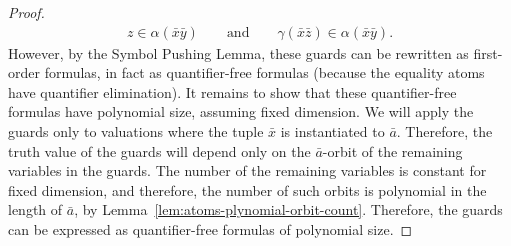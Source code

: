 \begin{proof}
  \begin{align*}
  z \in \alpha(\bar x \bar y) \qquad \text{and} \qquad 
  \gamma(\bar  x \bar z) \in \alpha(\bar x \bar y).
  \end{align*}
  However, by the Symbol Pushing Lemma, these guards can be rewritten as first-order formulas, in fact as quantifier-free formulas (because the equality atoms have quantifier elimination). It remains to show that these quantifier-free formulas have polynomial size, assuming fixed dimension. We will apply the guards only to valuations where the tuple $\bar x$ is instantiated to $\bar a$. Therefore, the truth value of the guards will depend only on the $\bar a$-orbit of the remaining variables in the guards. The number of the remaining variables is constant for fixed dimension, and therefore, the number of such orbits is polynomial in the length of $\bar a$, by Lemma~\ref{lem:atoms-plynomial-orbit-count}. Therefore, the guards can be expressed as quantifier-free formulas of polynomial size. 
\end{proof}







 
